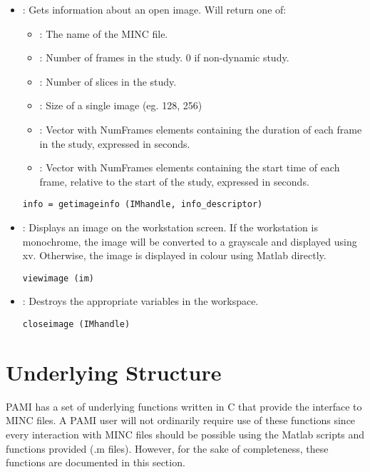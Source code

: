 \begin{itemize}
\item {} : Gets information about an open image.  Will return
    one of:
    \begin{itemize}
    \item {}  : The name of the MINC file.
    \item {} : Number of frames in the study. 0 if non-dynamic study.
    \item {} : Number of slices in the study.
    \item {} : Size of a single image (eg. 128, 256)
    \item {} : Vector with NumFrames elements containing the duration
          of each frame in the study, expressed in seconds.
    \item {} : Vector with NumFrames elements containing the start
          time of each frame, relative to the start of the study, expressed
          in seconds.
    \end{itemize}
\begin{verbatim}
info = getimageinfo (IMhandle, info_descriptor)
\end{verbatim}

\item {} : Displays an image on the workstation screen.  If the
    workstation is monochrome, the image will be converted to a grayscale and
    displayed using xv.  Otherwise, the image is displayed in colour using
    Matlab directly.
\begin{verbatim}
viewimage (im)
\end{verbatim}

\item {} : Destroys the appropriate variables in the workspace.
\begin{verbatim}
closeimage (IMhandle)
\end{verbatim}

\end{itemize}


\newpage
\section{Underlying Structure}

PAMI has a set of underlying functions written in C that provide the interface
to MINC files.  A PAMI user will not ordinarily require use of these functions
since every interaction with MINC files should be possible using the Matlab
scripts and functions provided (.m files).  However, for the sake of
completeness, these functions are documented in this section.

